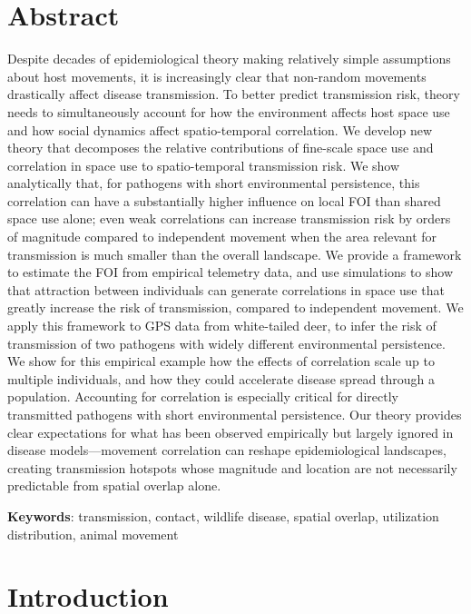 \documentclass[letterpaper]{article}
\begin{document}
\section*{Abstract} %
Despite decades of epidemiological theory making relatively simple assumptions about host movements, it is increasingly clear that non-random movements drastically affect disease transmission. To better predict transmission risk, theory needs to simultaneously account for how the environment affects host space use and how social dynamics affect spatio-temporal correlation. We develop new theory that decomposes the relative contributions of fine-scale space use and correlation in space use to spatio-temporal transmission risk. We show analytically that, for pathogens with short environmental persistence, this correlation can have a substantially higher influence on local FOI than shared space use alone; even weak correlations can increase transmission risk by orders of magnitude compared to independent movement when the area relevant for transmission is much smaller than the overall landscape. We provide a framework to estimate the FOI from empirical telemetry data, and use simulations to show that attraction between individuals can generate correlations in space use that greatly increase the risk of transmission, compared to independent movement. We apply this framework to GPS data from white-tailed deer, to infer the risk of transmission of two pathogens with widely different environmental persistence. We show for this empirical example how the effects of correlation scale up to multiple individuals, and how they could accelerate disease spread through a population. Accounting for correlation is especially critical for directly transmitted pathogens with short environmental persistence. Our theory provides clear expectations for what has been observed empirically but largely ignored in disease models---movement correlation can reshape epidemiological landscapes, creating transmission hotspots whose magnitude and location are not necessarily predictable from spatial overlap alone.

\bigskip
\noindent
\textbf{Keywords}: transmission, contact, wildlife disease, spatial overlap, utilization distribution, animal movement

\section*{Introduction}
\end{document}
